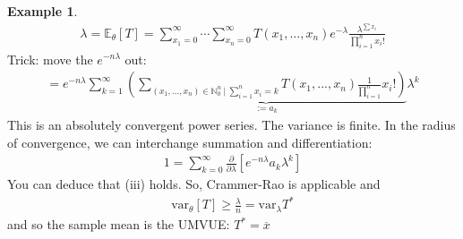 \documentclass[11pt]{scrartcl}
\theoremstyle{definition}
\newtheorem{ex}{Example}
\theoremstyle{remark}
\newcommand{\EXth}[1]{\mathbb{E}_\theta \left[ #1 \right]}
\begin{document}
\begin{ex}
	\begin{align*}
		\lambda = \EXth{T} = \sum_{x_1 = 0 }^\infty \cdots \sum_{x_n = 0}^\infty T(x_1, ..., x_n) e^{-\lambda}	\frac{\lambda^{\sum x_i}}{\prod_{i=1}^n x_i !} 
	\end{align*}
	Trick: move the $e^{-n \lambda}$ out: 
	\begin{align*}
		= e^{- n \lambda} \sum_{k=1}^\infty \underbrace{ \left( 	\sum_{(x_1, ..., x_n) \in \mathbb{N}_0^n\ |\ \sum_{i=1}^n x_i = k } T(x_1, ..., x_n) \frac{1}{\prod_{i=1}^n} x_i!	\right) }_{:= a_k}	\lambda^k
	\end{align*}
	This is an absolutely convergent power series. The variance is finite. In the radius of convergence, we can interchange summation and differentiation: 
	\begin{align*}
		1 = \sum_{k=0}^\infty \frac{\partial }{\partial \lambda}	 \left[ e^{-n \lambda} a_k \lambda^k \right] 
	\end{align*}
	You can deduce that (iii) holds. So, Crammer-Rao is applicable and 
	\begin{align*}
		\text{var}_\theta [T] \geq \frac{\lambda}{n} = \text{var}_\lambda T^*	
	\end{align*}
	and so the sample mean is the UMVUE: $T^* = \overline{x}$ 
\end{ex}
\end{document}
